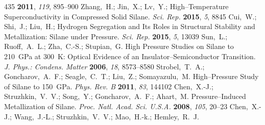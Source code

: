\documentclass[12pt,letterpaper,oneside]{article}
\begin{document}
\begin{mcitethebibliography}{435}
  \textbf{2011}, \emph{119}, 895--900\relax
\mciteBstWouldAddEndPuncttrue
\mciteSetBstMidEndSepPunct{\mcitedefaultmidpunct}
{\mcitedefaultendpunct}{\mcitedefaultseppunct}\relax
\EndOfBibitem
{}
Zhang,~H.; Jin,~X.; Lv,~Y.; 
  High--Temperature Superconductivity in Compressed Solid Silane. \emph{Sci.
  Rep.} \textbf{2015}, \emph{5}, 8845\relax
\mciteBstWouldAddEndPuncttrue
\mciteSetBstMidEndSepPunct{\mcitedefaultmidpunct}
{\mcitedefaultendpunct}{\mcitedefaultseppunct}\relax
\EndOfBibitem
{}
Cui,~W.; Shi,~J.; Liu,~H.;   Hydrogen
  Segregation and Its Roles in Structural Stability and Metallization: Silane
  under Pressure. \emph{Sci. Rep.} \textbf{2015}, \emph{5}, 13039\relax
\mciteBstWouldAddEndPuncttrue
\mciteSetBstMidEndSepPunct{\mcitedefaultmidpunct}
{\mcitedefaultendpunct}{\mcitedefaultseppunct}\relax
\EndOfBibitem
{}
Sun,~L.; Ruoff,~A.~L.; Zha,~C.-S.; Stupian,~G. High Pressure Studies on Silane
  to 210~GPa at 300~K: Optical Evidence of an Insulator--Semiconductor
  Transition. \emph{J. Phys.: Condens. Matter} \textbf{2006}, \emph{18},
  8573--8580\relax
\mciteBstWouldAddEndPuncttrue
\mciteSetBstMidEndSepPunct{\mcitedefaultmidpunct}
{\mcitedefaultendpunct}{\mcitedefaultseppunct}\relax
\EndOfBibitem
{}
Strobel,~T.~A.; Goncharov,~A.~F.; Seagle,~C.~T.; Liu,~Z.; Somayazulu,~M.
    High--Pressure Study of Silane to 150~GPa. \emph{Phys. Rev.
  B} \textbf{2011}, \emph{83}, 144102\relax
\mciteBstWouldAddEndPuncttrue
\mciteSetBstMidEndSepPunct{\mcitedefaultmidpunct}
{\mcitedefaultendpunct}{\mcitedefaultseppunct}\relax
\EndOfBibitem
{}
Chen,~X.-J.; Struzhkin,~V.~V.; Song,~Y.; Goncharov,~A.~F.; Ahart,~M.
    Pressure--Induced Metallization of Silane. \emph{Proc. Natl.
  Acad. Sci. U.S.A.} \textbf{2008}, \emph{105}, 20--23\relax
\mciteBstWouldAddEndPuncttrue
\mciteSetBstMidEndSepPunct{\mcitedefaultmidpunct}
{\mcitedefaultendpunct}{\mcitedefaultseppunct}\relax
\EndOfBibitem
{}
Chen,~X.-J.; Wang,~J.-L.; Struzhkin,~V.~V.; Mao,~H.-k.; Hemley,~R.~J.

\end{mcitethebibliography}
\end{document}
